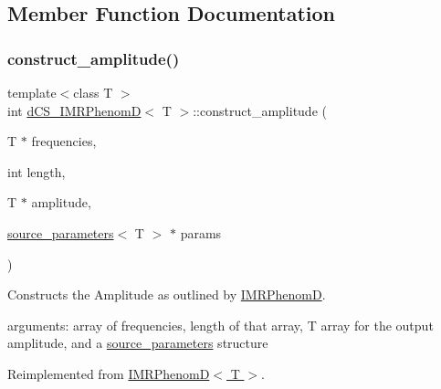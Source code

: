 \subsection{Member Function Documentation}
\mbox{\label{classdCS__IMRPhenomD_ad9dbe0caa4aed7d22b8e6226114ed4d9}} 
\subsubsection{\texorpdfstring{construct\+\_\+amplitude()}{construct\_amplitude()}}
{\footnotesize\ttfamily template$<$class T $>$ \\
int \hyperlink{classdCS__IMRPhenomD}{d\+C\+S\+\_\+\+I\+M\+R\+PhenomD}$<$ T $>$\+::construct\+\_\+amplitude (\begin{DoxyParamCaption}\item[{T $\ast$}]{frequencies,  }\item[{int}]{length,  }\item[{T $\ast$}]{amplitude,  }\item[{\hyperlink{structsource__parameters}{source\+\_\+parameters}$<$ T $>$ $\ast$}]{params }\end{DoxyParamCaption})\hspace{0.3cm}{\ttfamily [virtual]}}



Constructs the Amplitude as outlined by \hyperlink{classIMRPhenomD}{I\+M\+R\+PhenomD}. 

arguments\+: array of frequencies, length of that array, T array for the output amplitude, and a \hyperlink{structsource__parameters}{source\+\_\+parameters} structure 

Reimplemented from \hyperlink{classIMRPhenomD_a95e7946061fa24fdb7a770dba02147be}{I\+M\+R\+Phenom\+D$<$ T $>$}.

\mbox{\label{classdCS__IMRPhenomD_aeee3339b07c8088fc6a1f2c3390f92a4}} 
